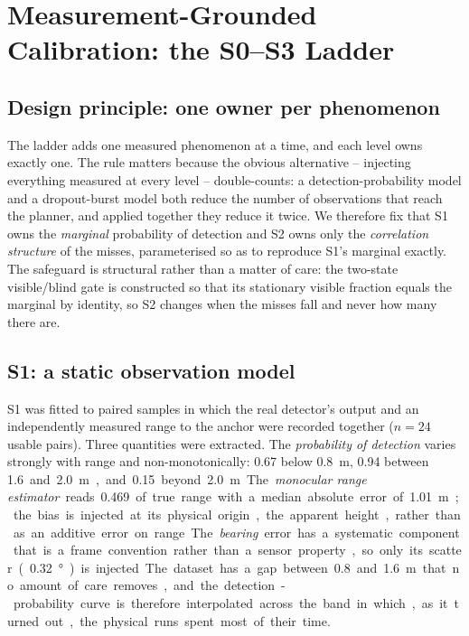 \section{Measurement-Grounded Calibration: the S0--S3 Ladder}
\label{sec:calibration}

\subsection{Design principle: one owner per phenomenon}

The ladder adds one measured phenomenon at a time, and each level owns
exactly one. The rule matters because the obvious alternative --
injecting everything measured at every level -- double-counts: a
detection-probability model and a dropout-burst model both reduce the
number of observations that reach the planner, and applied together they
reduce it twice. We therefore fix that S1 owns the \emph{marginal}
probability of detection and S2 owns only the \emph{correlation
structure} of the misses, parameterised so as to reproduce S1's marginal
exactly. The safeguard is structural rather than a matter of care: the
two-state visible/blind gate is constructed so that its stationary
visible fraction equals the marginal by identity, so S2 changes when the
misses fall and never how many there are.

\subsection{S1: a static observation model}

S1 was fitted to paired samples in which the real detector's output and
an independently measured range to the anchor were recorded together
($n=24$ usable pairs). Three quantities were extracted. The
\emph{probability of detection} varies strongly with range and
non-monotonically: \num{0.67} below \SI{0.8}{\metre}, \num{0.94} between
\SI{1.6} and \SI{2.0}{\metre}, and \num{0.15} beyond \SI{2.0}{\metre}.
The \emph{monocular range estimator} reads \num{0.469} of true range with
a median absolute error of \SI{1.01}{\metre}; the bias is injected at its
physical origin, the apparent height, rather than as an additive error on
range. The \emph{bearing} error has a systematic component that is a
frame convention rather than a sensor property, so only its scatter
(\SI{0.32}{\degree}) is injected.

The dataset has a gap between \SI{0.8} and \SI{1.6}{\metre} that no
amount of care removes, and the detection-probability curve is therefore
interpolated across the band in which, as it turned out, the physical
runs spent most of their time.

